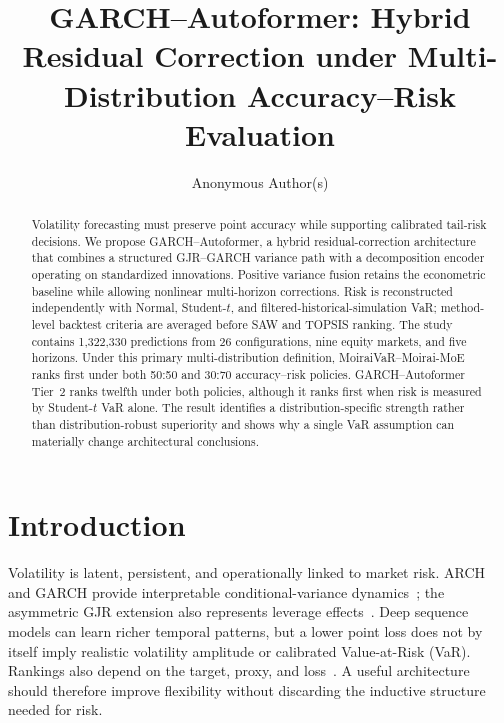 \documentclass[runningheads]{llncs}
\begin{document}
\title{GARCH--Autoformer: Hybrid Residual Correction under
Multi-Distribution Accuracy--Risk Evaluation}

\author{Anonymous Author(s)}

\maketitle

\begin{abstract}
Volatility forecasting must preserve point accuracy while supporting
calibrated tail-risk decisions. We propose GARCH--Autoformer, a hybrid
residual-correction architecture that combines a structured
GJR--GARCH variance path with a decomposition encoder operating on
standardized innovations. Positive variance fusion retains the
econometric baseline while allowing nonlinear multi-horizon
corrections. Risk is reconstructed independently with Normal,
Student-\(t\), and filtered-historical-simulation VaR; method-level
backtest criteria are averaged before SAW and TOPSIS ranking. The study
contains 1,322,330 predictions from 26 configurations, nine equity
markets, and five horizons. Under this primary multi-distribution
definition, MoiraiVaR--Moirai-MoE ranks first under both 50:50 and
30:70 accuracy--risk policies. GARCH--Autoformer Tier~2 ranks twelfth
under both policies, although it ranks first when risk is measured by
Student-\(t\) VaR alone. The result identifies a distribution-specific
strength rather than distribution-robust superiority and shows why a
single VaR assumption can materially change architectural conclusions.

\end{abstract}

\section{Introduction}

Volatility is latent, persistent, and operationally linked to market
risk. ARCH and GARCH provide interpretable conditional-variance
dynamics~\cite{engle1982,bollerslev1986}; the asymmetric GJR extension
also represents leverage effects~\cite{glosten1993}. Deep sequence
models can learn richer temporal patterns, but a lower point loss does
not by itself imply realistic volatility amplitude or calibrated
Value-at-Risk (VaR). Rankings also depend on the target, proxy, and
loss~\cite{patton2011}. A useful architecture should therefore improve
flexibility without discarding the inductive structure needed for risk.
\end{document}
